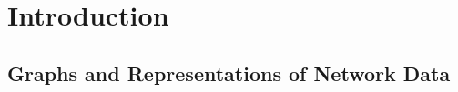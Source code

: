 \documentclass[
  12pt,
]{article}
\theoremstyle{definition}
\theoremstyle{definition}
\theoremstyle{definition}
\theoremstyle{definition}
\theoremstyle{remark}
\begin{document}

\newpage
{}
\hypersetup{linkcolor = blue}

{
\hypersetup{linkcolor=}
\setcounter{tocdepth}{2}
\tableofcontents
}
\setlength{\parindent}{20.0pt}
\newcommand{\diag}{\mathrm{diag}}
\newcommand{\tr}{\mathrm{Tr}}
\newcommand{\blockdiag}{\mathrm{blockdiag}}
\newcommand{\indep}{\stackrel{\mathrm{ind}}{\sim}}
\newcommand{\iid}{\stackrel{\mathrm{iid}}{\sim}}
\newcommand{\Bernoulli}{\mathrm{Bernoulli}}
\newcommand{\Betadist}{\mathrm{Beta}}
\newcommand{\BG}{\mathrm{BernoulliGraph}}
\newcommand{\Uniform}{\mathrm{Uniform}}
\newcommand{\PABM}{\mathrm{PABM}}
\newcommand{\RDPG}{\mathrm{RDPG}}
\newcommand{\GRDPG}{\mathrm{GRDPG}}
\newcommand{\Multinomial}{\mathrm{Multinomial}}
\newcommand{\dd}{\mathrm{d}}
\newcommand{\as}{\stackrel{\mathrm{a.s.}}{\to}}
\newcommand{\ER}{\text{Erd\"{o}s-R\'{e}nyi}}
\newcommand{\SBM}{\mathrm{SBM}}
\newcommand{\DCBM}{\mathrm{DCBM}}
\newcommand{\rank}{\mathrm{rank}}
\newcommand{\MBM}{\mathrm{MBM}}

\newpage

\hypertarget{introduction}{%
\section{Introduction}\label{introduction}}

\hypertarget{graphs-and-representations-of-network-data}{%
\subsection{Graphs and Representations of Network Data}\label{graphs-and-representations-of-network-data}}
\end{document}
